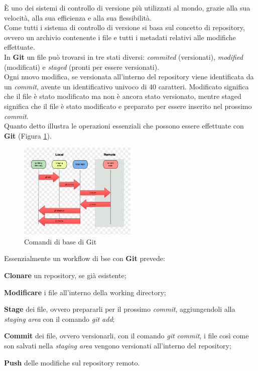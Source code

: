 \noindent È uno dei sistemi di controllo di versione più utilizzati al mondo, grazie alla sua velocità, alla sua efficienza e alla sua flessibilità.\\
Come tutti i sistema di controllo di versione si basa sul concetto di \gls{repository}{}, ovvero un archivio contenente i file e tutti i 
\gls{metadati}{} relativi alle modifiche effettuate.\\  
In \textbf{Git} un file può trovarsi in tre stati diversi: \textit{commited} (versionati), \textit{modified} (modificati) e \textit{staged} (pronti per essere versionati).\\
Ogni nuovo modifica, se versionata all'interno del \gls{repository} viene identificata da un \textit{commit}, avente un identificativo univoco di 40 caratteri. Modificato 
significa che il file è stato modificato ma non è ancora stato versionato, mentre staged significa che il file è stato modificato e preparato per essere inserito nel 
prossimo \textit{commit}.\\
Quanto detto illustra le operazioni essenziali che possono essere effettuate con \textbf{Git} (Figura \ref{fig:git_workflow}).
\begin{figure}[hpp]
    \centering
    \includegraphics[width=0.5\textwidth]{images/tecnologie/comandi_git.png}
    \caption{Comandi di base di Git}
    \label{fig:git_workflow}
\end{figure}
Essenzialmente un workflow di bse con \textbf{Git} prevede:
\begin{list}{-}{}
    \item \textbf{Clonare} un \gls{repository}{}, se già esistente;
    \item \textbf{Modificare} i file all'interno della \gls{working directory}{};
    \item \textbf{Stage} dei file, ovvero prepararli per il prossimo \textit{commit}, aggiungendoli alla \textit{staging area} con il comando \textit{git add};
    \item \textbf{Commit} dei file, ovvero versionarli, con il comando \textit{git commit}, i file così come son salvati nella \textit{staging area} vengono versionati all'interno del \gls{repository}{};
    \item \textbf{Push} delle modifiche sul \gls{repository}{} remoto.
\end{list}
